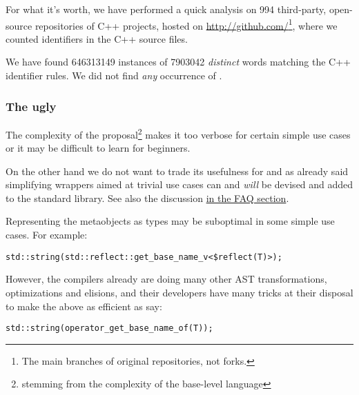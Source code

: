 For what it's worth, we have performed a quick analysis on \num{994} third-party,
open-source repositories of C++ projects, hosted on
\url{http://github.com/}\footnote{The main branches of original repositories,
not forks.}, where we counted identifiers in the C++ source files.

We have found \num{646313149} instances of \num{7903042} {\em distinct} words
matching the C++ identifier rules.  We did not find {\em any} occurrence of
.

\subsubsection{The ugly}

The complexity of the proposal\footnote{stemming from the complexity of the
base-level language} makes it too verbose for certain simple use cases
or it may be difficult to learn for beginners.

On the other hand we do not want to trade its usefulness for 
and as already said simplifying wrappers aimed at trivial use cases can 
and {\em will} be devised and added to the standard library.
See also the discussion \hyperref[faq-hard-on-novices]{in the FAQ section}.

Representing the metaobjects as types may be suboptimal in some simple
use cases. For example:

\begin{verbatim}
std::string(std::reflect::get_base_name_v<$reflect(T)>);
\end{verbatim}

However, the compilers already are doing many other AST transformations,
optimizations and elisions, and their developers have many tricks at their
disposal to make the above as efficient as say:

\begin{verbatim}
std::string(operator_get_base_name_of(T));
\end{verbatim}

